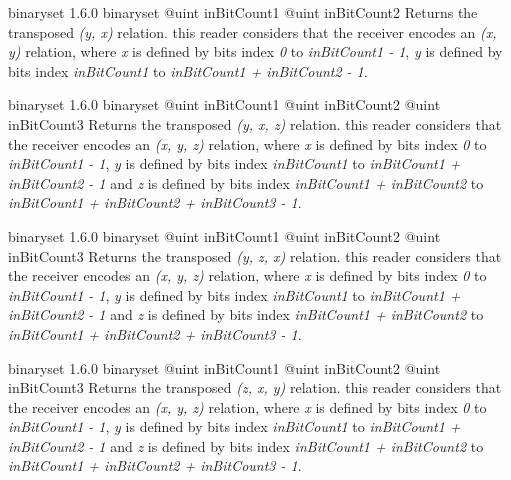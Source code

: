 {binaryset}
{1.6.0}
{binaryset}
{@uint inBitCount1}
{@uint inBitCount2}
{Returns the transposed \emph{(y, x)} relation.}
{this reader considers that the receiver encodes an \emph{(x, y)} relation, where \emph{x} is defined by bits index \emph{0} to \emph{inBitCount1  - 1}, \emph{y} is defined by bits index \emph{inBitCount1} to \emph{inBitCount1 + inBitCount2 - 1}.}







{binaryset}
{1.6.0}
{binaryset}
{@uint inBitCount1}
{@uint inBitCount2}
{@uint inBitCount3}
{Returns the transposed \emph{(y, x, z)} relation.}
{this reader considers that the receiver encodes an \emph{(x, y, z)} relation, where \emph{x} is defined by bits index \emph{0} to \emph{inBitCount1  - 1}, \emph{y} is defined by bits index \emph{inBitCount1} to \emph{inBitCount1 + inBitCount2 - 1} and  \emph{z} is defined by bits index \emph{inBitCount1 + inBitCount2} to \emph{inBitCount1 + inBitCount2 + inBitCount3 - 1}.}







{binaryset}
{1.6.0}
{binaryset}
{@uint inBitCount1}
{@uint inBitCount2}
{@uint inBitCount3}
{Returns the transposed \emph{(y, z, x)} relation.}
{this reader considers that the receiver encodes an \emph{(x, y, z)} relation, where \emph{x} is defined by bits index \emph{0} to \emph{inBitCount1  - 1}, \emph{y} is defined by bits index \emph{inBitCount1} to \emph{inBitCount1 + inBitCount2 - 1} and  \emph{z} is defined by bits index \emph{inBitCount1 + inBitCount2} to \emph{inBitCount1 + inBitCount2 + inBitCount3 - 1}.}







{binaryset}
{1.6.0}
{binaryset}
{@uint inBitCount1}
{@uint inBitCount2}
{@uint inBitCount3}
{Returns the transposed \emph{(z, x, y)} relation.}
{this reader considers that the receiver encodes an \emph{(x, y, z)} relation, where \emph{x} is defined by bits index \emph{0} to \emph{inBitCount1  - 1}, \emph{y} is defined by bits index \emph{inBitCount1} to \emph{inBitCount1 + inBitCount2 - 1} and  \emph{z} is defined by bits index \emph{inBitCount1 + inBitCount2} to \emph{inBitCount1 + inBitCount2 + inBitCount3 - 1}.}







